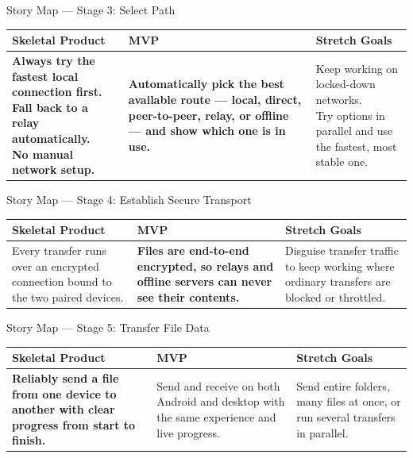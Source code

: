 \documentclass[xcolor=table,dvipsnames,svgnames,aspectratio=169]{beamer}
\newcommand{\core}[1]{\textcolor{cprimary}{\textbf{#1}}}
\newcommand{\stagecell}[1]{\begin{minipage}[t]{\linewidth}\raggedright #1\end{minipage}}
\begin{document}
\begin{frame}{Story Map --- Stage 3: Select Path}
\small
\renewcommand{\arraystretch}{1.42}
\begin{tabularx}{\textwidth}{@{}X X X@{}}
\toprule
\textbf{Skeletal Product} & \textbf{MVP} & \textbf{Stretch Goals} \\
\midrule
\stagecell{\core{Always try the fastest local connection first.\\
Fall back to a relay automatically.\\
No manual network setup.}} &
\stagecell{\core{Automatically pick the best available route --- local, direct, peer-to-peer, relay, or offline --- and show which one is in use.}} &
\stagecell{Keep working on locked-down networks.\\
Try options in parallel and use the fastest, most stable one.} \\
\bottomrule
\end{tabularx}
\end{frame}

\begin{frame}{Story Map --- Stage 4: Establish Secure Transport}
\small
\renewcommand{\arraystretch}{1.42}
\begin{tabularx}{\textwidth}{@{}X X X@{}}
\toprule
\textbf{Skeletal Product} & \textbf{MVP} & \textbf{Stretch Goals} \\
\midrule
\stagecell{Every transfer runs over an encrypted connection bound to the two paired devices.} &
\stagecell{\core{Files are end-to-end encrypted, so relays and offline servers can never see their contents.}} &
\stagecell{Disguise transfer traffic to keep working where ordinary transfers are blocked or throttled.} \\
\bottomrule
\end{tabularx}
\end{frame}

\begin{frame}{Story Map --- Stage 5: Transfer File Data}
\small
\renewcommand{\arraystretch}{1.42}
\begin{tabularx}{\textwidth}{@{}X X X@{}}
\toprule
\textbf{Skeletal Product} & \textbf{MVP} & \textbf{Stretch Goals} \\
\midrule
\stagecell{\core{Reliably send a file from one device to another with clear progress from start to finish.}} &
\stagecell{Send and receive on both Android and desktop with the same experience and live progress.} &
\stagecell{Send entire folders, many files at once, or run several transfers in parallel.} \\
\bottomrule
\end{tabularx}
\end{frame}
\end{document}

